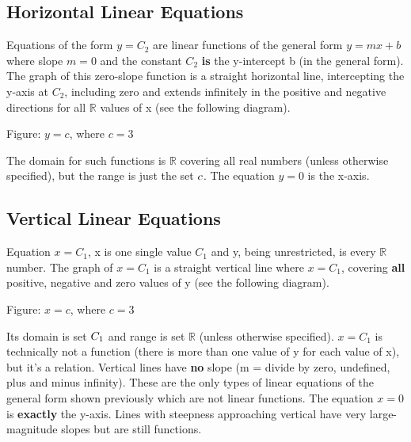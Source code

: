 \subsection{Horizontal Linear Equations}
\label{sss:hori-b67b}




Equations of the form $y = C _2$ are linear functions of the general form $y = m x + b$
where slope $m = 0$ and the constant $C _2$ \textbf{is} the y-intercept b (in the general
form). The graph of this zero-slope function is a straight horizontal line, intercepting
the y-axis at $C _2$, including zero and extends infinitely in the positive and negative
directions for all $\mathbb{R}$ values of x (see the following diagram).






Figure: $y = c$, where $c = 3$



The domain for such functions is $\mathbb{R}$ covering all real numbers (unless otherwise
specified), but the range is just the set $\\{ c \\}$. The equation $y = 0$ is the x-axis.




\subsection{Vertical Linear Equations}
\label{sss:vert-19e2}




Equation $x = C _1$, x is one single value $C _1$ and y, being unrestricted, is every
$\mathbb{R}$ number. The graph of $x = C _1$ is a straight vertical line where $x = C _1$,
covering \textbf{all} positive, negative and zero values of y (see the following diagram).






Figure: $x = c$, where $c = 3$



Its domain is set $\\{ C _1 \\}$ and range is set $\mathbb{R}$ (unless otherwise
specified). $x = C _1$ is technically not a function (there is more than one value of y
for each value of x), but it's a relation. Vertical lines have \textbf{no} slope (m =
divide by zero, undefined, plus and minus infinity). These are the only types of linear
equations of the general form shown previously which are not linear functions. The
equation $x = 0$ is \textbf{exactly} the y-axis. Lines with steepness approaching vertical
have very large-magnitude slopes but are still functions.




